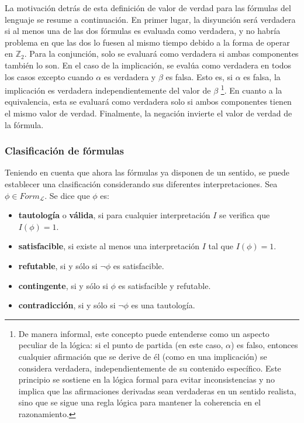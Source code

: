 \vspace{0.2cm}

La motivación detrás de esta definición de valor de verdad para las fórmulas del lenguaje se resume a continuación. En primer lugar, la disyunción será verdadera si al menos una de las dos fórmulas es evaluada como verdadera, y no habría problema en que las dos lo fuesen al mismo tiempo debido a la forma de operar en $\mathbb{Z}_2$. Para la conjunción, solo se evaluará como verdadera si ambas componentes también lo son. En el caso de la implicación, se evalúa como verdadera en todos los casos excepto cuando $\alpha$ es verdadera y $\beta$ es falsa. Esto es, si $\alpha$ es falsa, la implicación es verdadera independientemente del valor de $\beta$ \footnote{De manera informal, este concepto puede entenderse como un aspecto peculiar de la lógica: si el punto de partida (en este caso, $\alpha$) es falso, entonces cualquier afirmación que se derive de él (como en una implicación) se considera verdadera, independientemente de su contenido específico. Este principio se sostiene en la lógica formal para evitar inconsistencias y no implica que las afirmaciones derivadas sean verdaderas en un sentido realista, sino que se sigue una regla lógica para mantener la coherencia en el razonamiento.}. En cuanto a la equivalencia, esta se evaluará como verdadera solo si ambos componentes tienen el mismo valor de verdad. Finalmente, la negación invierte el valor de verdad de la fórmula.

\subsubsection{Clasificación de fórmulas}\label{subsubsection:lpropclassify}
Teniendo en cuenta que ahora las fórmulas ya disponen de un sentido, se puede establecer una clasificación considerando sus diferentes interpretaciones. Sea $\phi \in Form_{\mathcal{L}}$. Se dice que $\phi$ es:

\begin{itemize}
    \item \textbf{tautología} o \textbf{válida}, si para cualquier interpretación $I$ se verifica que $I(\phi) = 1$.
    \item \textbf{satisfacible}, si existe al menos una interpretación $I$ tal que $I(\phi) = 1$.
    \item \textbf{refutable}, si y sólo si $\neg\phi$ es satisfacible.
    \item \textbf{contingente}, si y sólo si $\phi$ es satisfacible y refutable.
    \item \textbf{contradicción}, si y sólo si $\neg\phi$ es una tautología.
\end{itemize}

